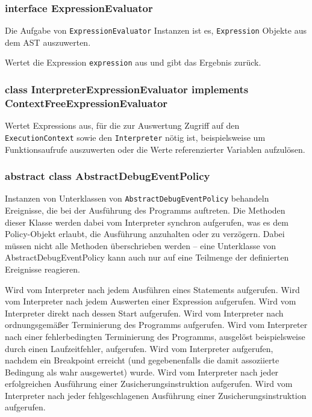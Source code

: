 \subsubsection{interface ExpressionEvaluator}
Die Aufgabe von \texttt{ExpressionEvaluator} Instanzen ist es, \texttt{Expression} Objekte aus dem AST auszuwerten.
\begin{description}
    Wertet die Expression \texttt{expression} aus und gibt das Ergebnis zurück.
\end{description}

\subsubsection{class InterpreterExpressionEvaluator implements ContextFreeExpressionEvaluator}
Wertet Expressions aus, für die zur Auswertung Zugriff auf den \texttt{ExecutionContext} sowie den \texttt{Interpreter} nötig ist, beispielsweise um Funktionsaufrufe auszuwerten oder die Werte referenzierter Variablen aufzulösen.

\subsubsection{abstract class AbstractDebugEventPolicy}
Instanzen von Unterklassen von \texttt{AbstractDebugEventPolicy} behandeln Ereignisse, die bei der Ausführung des Programms auftreten. Die Methoden dieser Klasse werden dabei vom Interpreter synchron aufgerufen, was es dem Policy-Objekt erlaubt, die Ausführung anzuhalten oder zu verzögern. Dabei müssen nicht alle Methoden überschrieben werden -- eine Unterklasse von AbstractDebugEventPolicy kann auch nur auf eine Teilmenge der definierten Ereignisse reagieren.

\begin{description}
    Wird vom Interpreter nach jedem Ausführen eines Statements aufgerufen.
    Wird vom Interpreter nach jedem Auswerten einer Expression aufgerufen.
    Wird vom Interpreter direkt nach dessen Start aufgerufen.
    Wird vom Interpreter nach ordnungsgemäßer Terminierung des Programms aufgerufen.
    Wird vom Interpreter nach einer fehlerbedingten Terminierung des Programms, ausgelöst beispielsweise durch einen Laufzeitfehler, aufgerufen.
    Wird vom Interpreter aufgerufen, nachdem ein Breakpoint erreicht (und gegebenenfalls die damit assoziierte Bedingung als wahr ausgewertet) wurde.
    Wird vom Interpreter nach jeder erfolgreichen Ausführung einer Zusicherungsinstruktion aufgerufen.
    Wird vom Interpreter nach jeder fehlgeschlagenen Ausführung einer Zusicherungsinstruktion aufgerufen.
\end{description}
